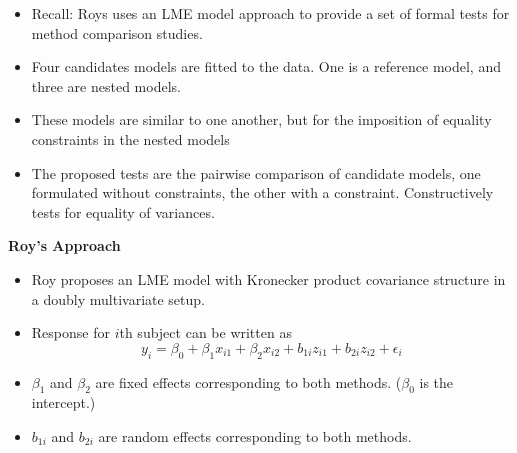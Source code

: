 \documentclass[compress]{beamer}        %
\makeatletter
\newcommand{\tcb}{\textcolor{beamer@blendedblue}}
\makeatother
\begin{document}
\begin{frame}
\begin{itemize}

\item Recall: Roys uses an LME model approach to provide a set of formal tests for method comparison studies.\\

\item Four candidates models are fitted to the data. One is a reference model, and three are nested models.

\item 
These models are similar to one another, but for the imposition of equality constraints in the nested models

\item 
The proposed tests are the pairwise comparison of candidate models, one formulated without constraints, the other with a constraint. Constructively tests for equality of variances.\\


\end{itemize}
\end{frame}

\begin{frame}{\bf \tcb{Roy's Approach}}
\begin{itemize}\itemsep0.4cm
\item Roy proposes an LME model with Kronecker product covariance structure in a doubly multivariate setup.
\item Response for $i$th subject can be written as
\[ y_i = \beta_0 + \beta_1x_{i1} + \beta_2x_{i2} + b_{1i}z_{i1}  + b_{2i}z_{i2} + \epsilon_i \]
\item $\beta_1$ and $\beta_2$ are fixed effects corresponding to both methods. ($\beta_0$ is the intercept.)
\item $b_{1i}$ and $b_{2i}$ are random effects corresponding to both methods.
\end{itemize}
\end{frame}
\end{document}

